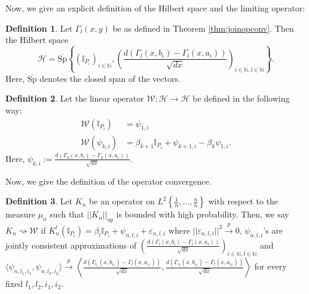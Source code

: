 \documentclass[reqno,12pt]{amsart}
\theoremstyle{plain}
\theoremstyle{definition}
\newtheorem{definition}{Definition}
\begin{document}
Now, we give an explicit definition of the Hilbert space and the limiting operator:
\begin{definition}\label{def:limspace}
Let $\Gamma_{l}(x,y)$ be as defined in Theorem \ref{thm:joinopconv}. Then the Hilbert space $$\mathcal{H} = \overline{\mathrm{Sp}}\left\{ \left(\mathbb{I}_{P_{i}}\right)_{i \in \mathbb{N}}, \left( \frac{d\left( \Gamma_{l}(x,b_{i}) -\Gamma_{l}(x,a_{i})\right)}{\sqrt{dx}}\right)_{i \in \mathbb{N}, l \in \mathbb{N}}   \right\}.$$ Here, $\overline{\mathrm{Sp}}$ denotes the closed span of the vectors. 
\end{definition}
\begin{definition}\label{def:limop}
Let the linear operator $\mathcal{W}: \mathcal{H} \to \mathcal{H}$ be defined in the following way:
\begin{equation}\label{eq:operatordefinition}
\begin{split}
\mathcal{W}(\mathbb{I}_{P_{i}}) &= \psi_{1,i}\\
\mathcal{W}\left(\psi_{k,i}\right) &= \beta_{k+1} \mathbb{I}_{P_{i}}+ \psi_{k+1,i} - \beta_{k}\psi_{1,i}.
\end{split}
\end{equation} 
Here,
$\psi_{k,i}:= \frac{d\left( \Gamma_{k}(x,b_{i}) -\Gamma_{k}(x,a_{i})\right)}{\sqrt{dx}}$.
\end{definition}
Now, we give the definition of the operator convergence. 
\begin{definition}\label{def:opconv}
    Let $K_{n}$ be an operator on $L^{2}\left\{ \frac{1}{n},\ldots, \frac{n}{n} \right\}$ with respect to the measure $\mu_{n}$ such that $||K_{n}||_{op}$ is bounded with high probability. Then, we say $K_{n} \rightsquigarrow \mathcal{W}$ if $K_{n}^{l}\left( \mathbb{I}_{P_{i}} \right)=\beta_{l}\mathbb{I}_{P_{i}}+ \psi_{n,l,i}+ \varepsilon_{n,l,i}$ where $||\varepsilon_{n,l,i}||^2 \stackrel{p}{\to} 0$, $\psi_{n,l,i}$'s are jointly consistent approximations of  $\left( \frac{d\left( \Gamma_{l}(x,b_{i}) -\Gamma_{l}(x,a_{i})\right)}{\sqrt{dx}}\right)_{i \in \mathbb{N}, l \in \mathbb{N}}$ and $\langle \psi_{n,l_{1},i_{1}}, \psi_{n,l_{2},i_{2}}  \rangle \stackrel{p}{\to} \left\langle \frac{d\left( \Gamma_{l_{1}}(x,b_{i_{1}}) -\Gamma_{l}(x,a_{i_{1}})\right)}{\sqrt{dx}}, \frac{d\left( \Gamma_{l_{2}}(x,b_{i_{2}}) -\Gamma_{l}(x,a_{i_{2}})\right)}{\sqrt{dx}} \right\rangle$ for every fixed $l_{1},l_{2}, i_{1}, i_{2}$.
\end{definition}
\end{document}
